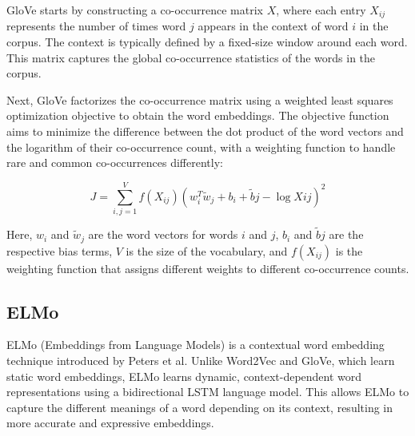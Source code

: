 \documentclass[12pt]{article}
\begin{document}
GloVe starts by constructing a co-occurrence matrix $X$, where each entry $X_{ij}$ represents the number of times word $j$ appears in the context of word $i$ in the corpus. The context is typically defined by a fixed-size window around each word. This matrix captures the global co-occurrence statistics of the words in the corpus.

Next, GloVe factorizes the co-occurrence matrix using a weighted least squares optimization objective to obtain the word embeddings. The objective function aims to minimize the difference between the dot product of the word vectors and the logarithm of their co-occurrence count, with a weighting function to handle rare and common co-occurrences differently:

\begin{equation}
J = \sum_{i, j=1}^V f(X_{ij}) \left( w_i^T \tilde{w}_j + b_i + \tilde{b}j - \log X{ij} \right)^2
\end{equation}

Here, $w_i$ and $\tilde{w}_j$ are the word vectors for words $i$ and $j$, $b_i$ and $\tilde{b}j$ are the respective bias terms, $V$ is the size of the vocabulary, and $f(X_{ij})$ is the weighting function that assigns different weights to different co-occurrence counts.

\subsection{ELMo}

ELMo (Embeddings from Language Models) is a contextual word embedding technique introduced by Peters et al. Unlike Word2Vec and GloVe, which learn static word embeddings, ELMo learns dynamic, context-dependent word representations using a bidirectional LSTM language model. This allows ELMo to capture the different meanings of a word depending on its context, resulting in more accurate and expressive embeddings.
\end{document}
